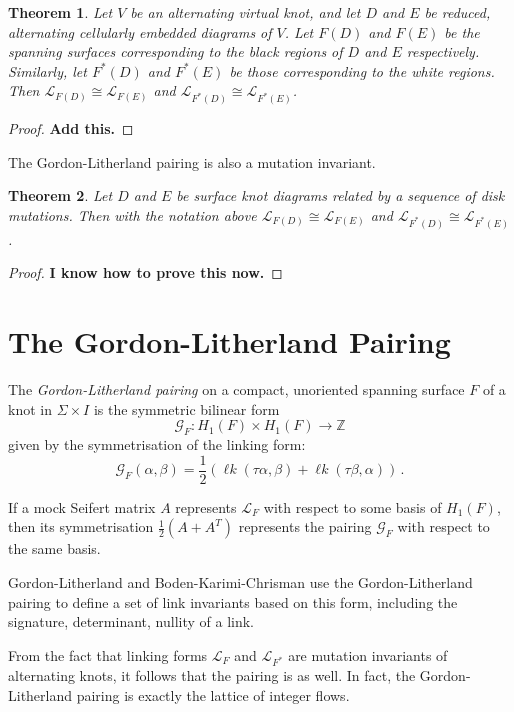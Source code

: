 \documentclass[12pt]{report}
\newcommand{\Z}{\mathbb{Z}}
\newcommand{\lk}{\operatorname{\ell\textit{k}}}
\newcommand{\notered}[1]{{\color{Red} \textbf{#1}}}
\newtheorem*{theorem}{Theorem}
\theoremstyle{upright}
\begin{document}
\begin{theorem}
Let $V$ be an alternating virtual knot, and let $D$ and $E$ be reduced, alternating cellularly embedded diagrams of $V$. Let $F(D)$ and $F(E)$ be the spanning surfaces corresponding to the black regions of $D$ and $E$ respectively. Similarly, let $F^{*}(D)$ and $F^{*}(E)$ be those corresponding to the white regions. Then $\mathcal{L}_{F(D)} \cong \mathcal{L}_{F(E)}$ and $\mathcal{L}_{F^{*}(D)} \cong \mathcal{L}_{F^{*}(E)}$.
\end{theorem}

\begin{proof}
	\notered{Add this.}
\end{proof}

The Gordon-Litherland pairing is also a mutation invariant.

\begin{theorem}
Let $D$ and $E$ be surface knot diagrams related by a sequence of disk mutations. Then with the notation above $\mathcal{L}_{F(D)} \cong \mathcal{L}_{F(E)}$ and $\mathcal{L}_{F^{*}(D)} \cong \mathcal{L}_{F^{*}(E)}$.
\end{theorem}

\begin{proof}
\notered{I know how to prove this now.}
\end{proof}

\section{The Gordon-Litherland Pairing}

The \textit{Gordon-Litherland pairing} on a compact, unoriented spanning surface $F$ of a knot in $\Sigma \times I$ is the symmetric bilinear form
\[\mathcal{G}_{F}: H_{1}(F) \times H_{1}(F) \longrightarrow \Z\]
given by the symmetrisation of the linking form:
\[\mathcal{G}_{F}(\alpha, \beta) = \dfrac{1}{2}(\lk(\tau \alpha, \beta) + \lk(\tau\beta, \alpha))\,.\]

If a mock Seifert matrix $A$ represents $\mathcal{L}_{F}$ with respect to some basis of $H_{1}(F)$, then its symmetrisation $\frac{1}{2}(A + A^{T})$ represents the pairing $\mathcal{G}_{F}$ with respect to the same basis.

Gordon-Litherland and Boden-Karimi-Chrisman use the Gordon-Litherland pairing to define a set of link invariants based on this form, including the signature, determinant, nullity of a link.

From the fact that linking forms $\mathcal{L}_{F}$ and $\mathcal{L}_{F^{*}}$ are mutation invariants of alternating knots, it follows that the pairing is as well. In fact, the Gordon-Litherland pairing is exactly the lattice of integer flows.
\end{document}
